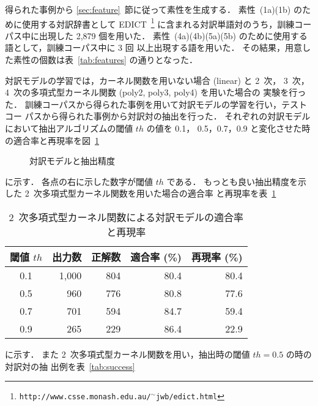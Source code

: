 得られた事例から \ref{sec:feature}~節に従って素性を生成する．
素性~(1a)(1b) のために使用する対訳辞書として
EDICT~\footnote{\tt http://www.csse.monash.edu.au/$\mbox{}^\sim$jwb/edict.html}
に含まれる対訳単語対のうち，訓練コーパス中に出現した 2,879 個を用いた．
素性~(4a)(4b)(5a)(5b) のために使用する語として，訓練コーパス中に 3 回
以上出現する語を用いた．
その結果，用意した素性の個数は表~\ref{tab:features} の通りとなった．

対訳モデルの学習では，カーネル関数を用いない場合 (linear) と 2~次，
3~次，4~次の多項式型カーネル関数 (poly2, poly3, poly4) を用いた場合の
実験を行った．
訓練コーパスから得られた事例を用いて対訳モデルの学習を行い，テストコー
パスから得られた事例から対訳対の抽出を行った．
それぞれの対訳モデルにおいて抽出アルゴリズムの閾値 $th$ の値を 0.1，
0.5，0.7，0.9 と変化させた時の適合率と再現率を図~\ref{fig:result}
\begin{figure}[tbp]
\begin{center}
  \caption{対訳モデルと抽出精度}
  \label{fig:result}
\end{center}
\end{figure}
に示す．
各点の右に示した数字が閾値 $th$ である．
もっとも良い抽出精度を示した 2~次多項式型カーネル関数を用いた場合の適合率
と再現率を表~\ref{tab:result}
\begin{table}[tbp]
  \centering
  \caption{2~次多項式型カーネル関数による対訳モデルの適合率と再現率}
  \label{tab:result}
  \begin{small}
    \begin{tabular}{|c|r|r|r|r|} \hline
      閾値 $th$ & 出力数 & 正解数 &
      \multicolumn{1}{c|}{適合率 (\%)} &
      \multicolumn{1}{c|}{再現率 (\%)}  \\ \hline
      0.1 & 1,000 & 804 & 80.4 & 80.4 \\ 
      0.5 & 960 & 776 & 80.8 & 77.6 \\ 
      0.7 & 701 & 594 & 84.7 & 59.4 \\
      0.9 & 265 & 229 & 86.4 & 22.9 \\ \hline
    \end{tabular}
  \end{small}
\end{table}
に示す．
また 2~次多項式型カーネル関数を用い，抽出時の閾値 $th=0.5$ の時の対訳対の抽
出例を表~\ref{tab:success}
